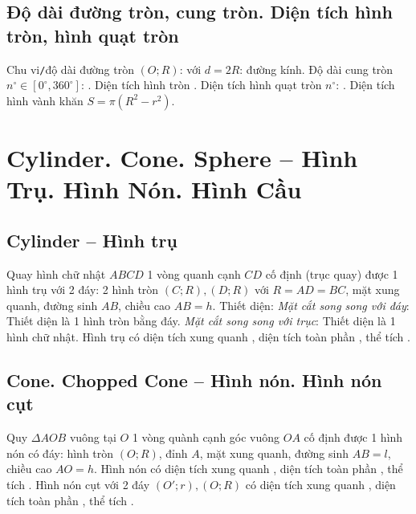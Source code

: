 \documentclass{article}
\begin{document}
\subsection{Độ dài đường tròn, cung tròn. Diện tích hình tròn, hình quạt tròn}
 Chu vi{\tt/}độ dài đường tròn $(O;R)$:  với $d = 2R$: đường kính. Độ dài cung tròn $n^\circ\in[0^\circ,360^\circ]$: .  Diện tích hình tròn . Diện tích hình quạt tròn $n^\circ$: .  Diện tích hình vành khăn $S = \pi(R^2 - r^2)$.


\section{Cylinder. Cone. Sphere -- Hình Trụ. Hình Nón. Hình Cầu}

\subsection{Cylinder -- Hình trụ}
 Quay hình chữ nhật $ABCD$ 1 vòng quanh cạnh $CD$ cố định (trục quay) được 1 hình trụ với 2 đáy: 2 hình tròn $(C;R),(D;R)$ với $R = AD = BC$, mặt xung quanh, đường sinh $AB$, chiều cao $AB = h$.  {\sf Thiết diện}: \textit{Mặt cắt song song với đáy}: Thiết diện là 1 hình tròn bằng đáy. \textit{Mặt cắt song song với trục}: Thiết diện là 1 hình chữ nhật.  Hình trụ có diện tích xung quanh , diện tích toàn phần , thể tích .

\subsection{Cone. Chopped Cone -- Hình nón. Hình nón cụt}
 Quy $\Delta AOB$ vuông tại $O$ 1 vòng quành cạnh góc vuông $OA$ cố định được 1 hình nón có đáy: hình tròn $(O;R)$, đỉnh $A$, mặt xung quanh, đường sinh $AB = l$, chiều cao $AO = h$.  Hình nón có diện tích xung quanh , diện tích toàn phần , thể tích .  Hình nón cụt với 2 đáy $(O';r),(O;R)$ có diện tích xung quanh , diện tích toàn phần , thể tích .
\end{document}
